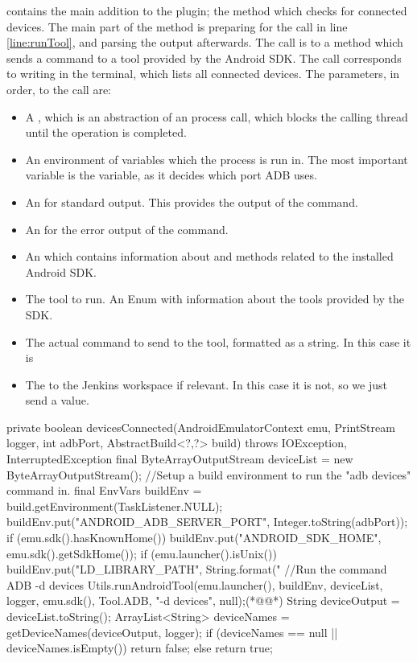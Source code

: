  contains the main addition to the plugin; the method which checks for connected devices. The main part of the method is preparing for the call in line \ref{line:runTool}, and parsing the output afterwards. The call is to a method which sends a command to a tool provided by the Android SDK. The call corresponds to writing  in the terminal, which lists all connected devices. The parameters, in order, to the call are:

\begin{itemize}
  \item A , which is an abstraction of an process call, which blocks the calling thread until the operation is completed.
  \item An environment of variables which the process is run in. The most important variable is the  variable, as it decides which port ADB uses.
  \item An  for standard output. This provides the output of the command.
  \item An  for the error output of the command.
  \item An  which contains information about and methods related to the installed Android SDK.
  \item The tool to run. An Enum with information about the tools provided by the SDK.
  \item The actual command to send to the tool, formatted as a string. In this case it is 
  \item The  to the Jenkins workspace if relevant. In this case it is not, so we just send a  value.
\end{itemize}

\begin{javacode}[float=tb, caption=The devicesConnected method which checks for connected devices.,label=lst:deviceCheck]
private boolean devicesConnected(AndroidEmulatorContext emu, PrintStream logger, int adbPort, AbstractBuild<?,?> build)
throws IOException, InterruptedException {
    final ByteArrayOutputStream deviceList = new ByteArrayOutputStream();
    //Setup a build environment to run the "adb devices" command in.
    final EnvVars buildEnv = build.getEnvironment(TaskListener.NULL);
    buildEnv.put("ANDROID_ADB_SERVER_PORT", Integer.toString(adbPort));
    if (emu.sdk().hasKnownHome()) {
        buildEnv.put("ANDROID_SDK_HOME", emu.sdk().getSdkHome());
    }
    if (emu.launcher().isUnix()) {
        buildEnv.put("LD_LIBRARY_PATH", String.format("%
    }
    //Run the command ADB -d devices
    Utils.runAndroidTool(emu.launcher(), buildEnv, deviceList, logger, emu.sdk(), Tool.ADB, "-d devices", null);(*@\label{line:runTool}@*)
    String deviceOutput = deviceList.toString();
    ArrayList<String> deviceNames = getDeviceNames(deviceOutput, logger);
    if (deviceNames == null || deviceNames.isEmpty()) {
        return false;
    }
    else {
        return true;
    }
}
\end{javacode}

